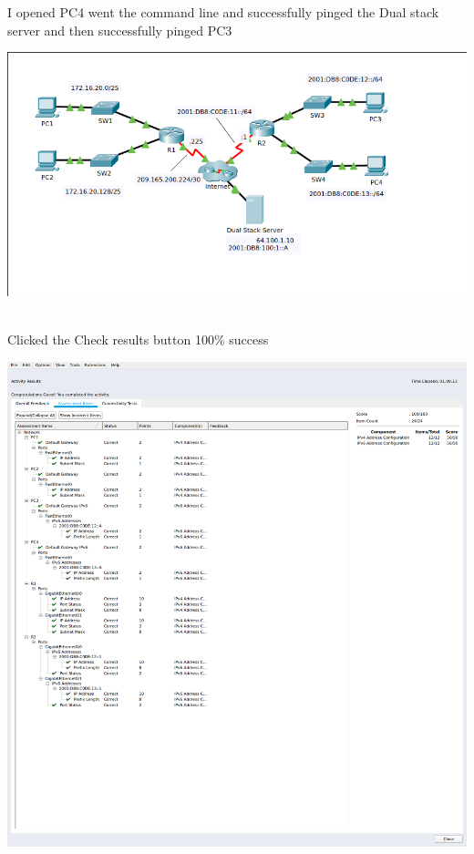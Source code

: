 \documentclass[../EngineeringJournal_CDavis.tex]{subfiles}
\begin{document}
I opened PC4 went the command line and successfully pinged the Dual stack server and then successfully pinged PC3
\begin{center}
	\includegraphics[scale=0.4]{Figures/2020-01-23-142952_808x429_scrot.png}
\end{center}

\newpage


\\Clicked the Check results button 100\% success
\begin{center}
	\includegraphics[scale=0.30]{Figures/2020-01-23-143037_1304x1378_scrot.png}
\end{center}
\end{document}
